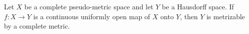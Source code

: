 \begin{theorem}
Let $X$ be a complete pseudo-metric space and let $Y$ be a Hausdorff space. If $f: X \to Y$ is a continuous uniformly open map of $X$ onto $Y$, then $Y$ is metrizable by a complete metric.
\end{theorem}
